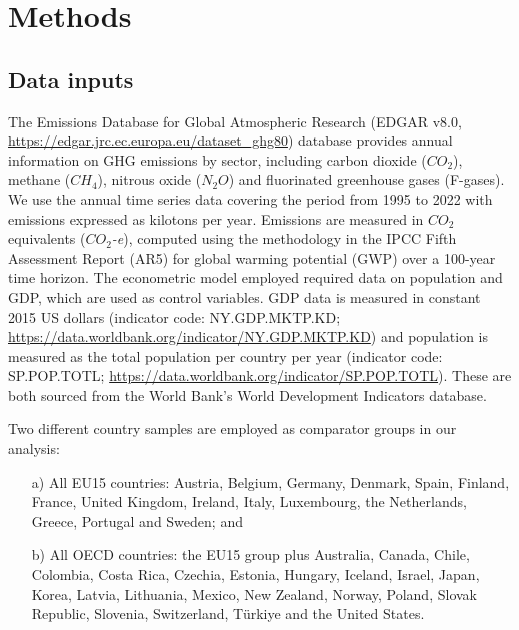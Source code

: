 \documentclass[a4paper]{article}
\begin{document}

\section*{Methods}

\subsection*{Data inputs}\label{subsec:data}

The Emissions Database for Global Atmospheric Research (EDGAR v8.0,
\url{https://edgar.jrc.ec.europa.eu/dataset_ghg80}) database \cite{EDGAR_8} provides annual information on GHG emissions by sector, including carbon dioxide ($CO_2$), methane ($CH_4$), nitrous oxide ($N_2O$) and fluorinated greenhouse gases (F-gases). We use the annual time series data covering the period from 1995 to 2022 with emissions expressed as kilotons per year. Emissions are measured in $CO_2$ equivalents ($CO_2$\textit{-e}), computed using the methodology in the IPCC Fifth Assessment Report (AR5) for global warming potential (GWP) over a 100-year time horizon. \cite{IPCC2014} The econometric model employed required data on population and GDP, which are used as control variables. GDP data is measured in constant 2015 US dollars (indicator code: NY.GDP.MKTP.KD; \url{https://data.worldbank.org/indicator/NY.GDP.MKTP.KD}) and population is measured as the total population per country per year (indicator code: SP.POP.TOTL; \url{https://data.worldbank.org/indicator/SP.POP.TOTL}). These are both sourced from the World Bank's World Development Indicators database. \cite{WB_GDP, WB_pop}

Two different country samples are employed as comparator groups in our analysis:
\begin{enumerate}
    \item[a)] All EU15 countries: Austria, Belgium, Germany, Denmark, Spain, Finland, France, United Kingdom, Ireland, Italy, Luxembourg, the Netherlands, Greece, Portugal and Sweden; and
    \item[b)] All OECD countries: the EU15 group plus Australia, Canada, Chile, Colombia, Costa Rica, Czechia, Estonia, Hungary, Iceland, Israel, Japan, Korea, Latvia, Lithuania, Mexico, New Zealand, Norway, Poland, Slovak Republic, Slovenia, Switzerland, Türkiye and the United States.
\end{enumerate}
\end{document}
